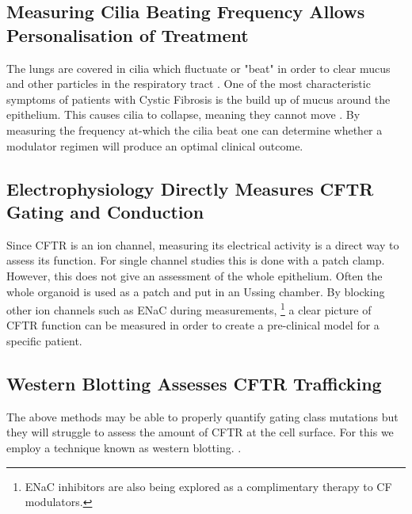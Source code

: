\subsection{Measuring Cilia Beating Frequency Allows Personalisation of Treatment}
The lungs are covered in cilia which fluctuate or "beat" in order to clear mucus and other particles in the respiratory tract \cite{mitchison2010, bustamante-marin2017}. One of the most characteristic symptoms of patients with Cystic Fibrosis is the build up of mucus around the epithelium. This causes cilia to collapse, meaning they cannot move \cite{}. By measuring the frequency at-which the cilia beat one can determine whether a modulator regimen will produce an optimal clinical outcome.

\subsection{Electrophysiology Directly Measures CFTR Gating and Conduction}
Since CFTR is an ion channel, measuring its electrical activity is a direct way to assess its function. For single channel studies this is done with a patch clamp. However, this does not give an assessment of the whole epithelium. Often the whole organoid is used as a patch and put in an Ussing chamber. By blocking other ion channels such as ENaC during measurements, \footnote{ENaC inhibitors are also being explored as a complimentary therapy to CF modulators\cite{mall2020}. } a clear picture of CFTR function can be measured in order to create a pre-clinical model for a specific patient.

\subsection{Western Blotting Assesses CFTR Trafficking}
The above methods may be able to properly quantify gating class mutations but they will struggle to assess the amount of CFTR at the cell surface. For this we employ a technique known as western blotting. .
